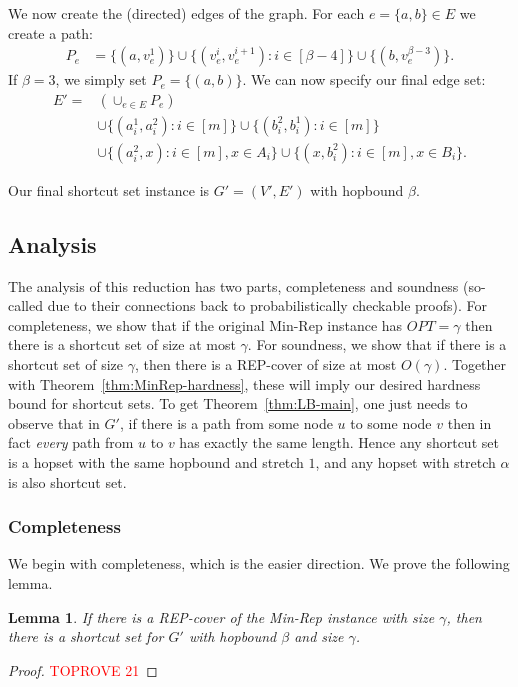 \documentclass{article}
\newtheorem{lemma}[theorem]{Lemma}
\theoremstyle{definition}
\theoremstyle{remark}
\begin{document}
We now create the (directed) edges of the graph.  For each $e = \{a,b\} \in E$ we create a path:
\begin{align*}
    P_e &= \{(a, v_e^1)\} \cup \{(v_e^i, v_e^{i+1}) : i \in [\beta-4]\} \cup \{(b, v_e^{\beta-3})\}.
\end{align*}
If $\beta = 3$, we simply set $P_e = \{(a,b)\}$.  We can now specify our final edge set:
\begin{align*}
    E' = &\left(\cup_{e \in E} P_e\right) \\
    &\cup \{(a_i^1, a_i^2) : i \in [m]\} \cup \{(b_i^2, b_i^1) : i \in [m]\} \\
    &\cup \{(a_i^2, x) : i \in [m], x \in A_i\} \cup \{(x, b_i^2) : i \in [m], x \in B_i\}.
\end{align*}

Our final shortcut set instance is $G' = (V', E')$ with hopbound $\beta$.

\subsection{Analysis}
The analysis of this reduction has two parts, completeness and soundness (so-called due to their connections back to probabilistically checkable proofs).  For completeness, we show that if the original Min-Rep instance has $OPT = \gamma$ then there is a shortcut set of size at most $\gamma$.  For soundness, we show that if there is a shortcut set of size $\gamma$, then there is a REP-cover of size at most $O(\gamma)$.  Together with Theorem~\ref{thm:MinRep-hardness}, these will imply our desired hardness bound for shortcut sets.  To get Theorem~\ref{thm:LB-main}, one just needs to observe that in $G'$, if there is a path from some node $u$ to some node $v$ then in fact \emph{every} path from $u$ to $v$ has exactly the same length.  Hence any shortcut set is a hopset with the same hopbound and stretch $1$, and any hopset with stretch $\alpha$ is also shortcut set.

\subsubsection{Completeness}
We begin with completeness, which is the easier direction.  We prove the following lemma.

\begin{lemma} \label{lem:completeness}
    If there is a REP-cover of the Min-Rep instance with size $\gamma$, then there is a shortcut set for $G'$ with hopbound $\beta$ and size $\gamma$.
\end{lemma}
\begin{proof}\textcolor{red}{TOPROVE 21}\end{proof}
\end{document}
